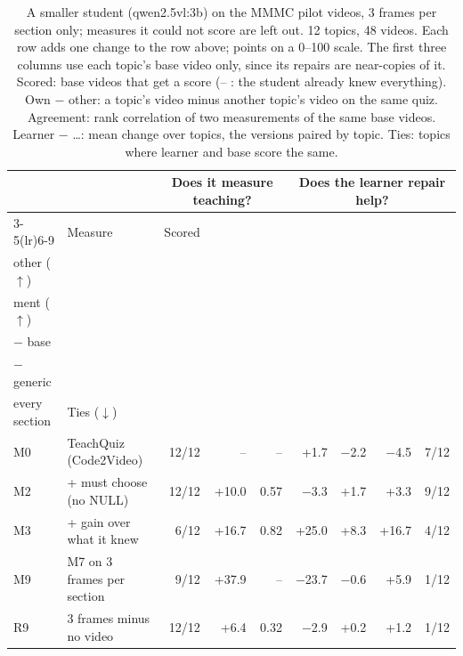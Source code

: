 \begin{table}[t]\centering\footnotesize
\caption{A smaller student (qwen2.5vl:3b) on the MMMC pilot videos, 3 frames per section only; measures it could not score are left out. 12 topics, 48 videos. Each row adds one change to the row above; points on a 0--100 scale. The first three columns use each topic's base video only, since its repairs are near-copies of it. Scored: base videos that get a score (-- : the student already knew everything). Own $-$ other: a topic's video minus another topic's video on the same quiz. Agreement: rank correlation of two measurements of the same base videos. Learner $-$ \ldots: mean change over topics, the versions paired by topic. Ties: topics where learner and base score the same.}\label{tab:ladder_small}
\setlength{\tabcolsep}{4pt}\begin{tabular}{@{}llrrrrrrr@{}}\toprule & & \multicolumn{3}{c}{Does it measure teaching?} & \multicolumn{4}{c}{Does the learner repair help?}\\
\cmidrule(lr){3-5}\cmidrule(lr){6-9}
& Measure & Scored & \hd{Own $-$\\other ($\uparrow$)} & \hd{Agree-\\ment ($\uparrow$)} & \hd{Learner\\$-$ base} & \hd{Learner\\$-$ generic} & \hd{Learner $-$\\every section} & Ties ($\downarrow$)\\\midrule
M0 & TeachQuiz (Code2Video) & 12/12 & -- & -- & +1.7 & $-$2.2 & $-$4.5 & 7/12 \\
M2 & + must choose (no NULL) & 12/12 & +10.0 & 0.57 & $-$3.3 & +1.7 & +3.3 & 9/12 \\
M3 & + gain over what it knew & 6/12 & +16.7 & 0.82 & +25.0 & +8.3 & +16.7 & 4/12 \\
M9 & M7 on 3 frames per section & 9/12 & +37.9 & -- & $-$23.7 & $-$0.6 & +5.9 & 1/12 \\
R9 & 3 frames minus no video & 12/12 & +6.4 & 0.32 & $-$2.9 & +0.2 & +1.2 & 1/12 \\
\bottomrule\end{tabular}
\end{table}
